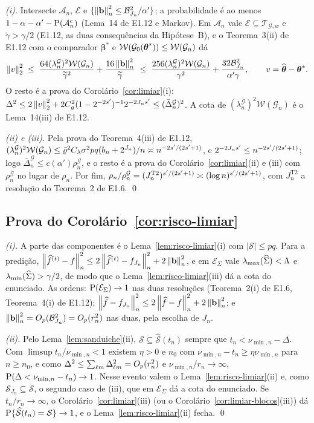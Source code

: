 \documentclass[11pt,a4paper]{article}
\newcommand{\lmin}{\lambda_{\min}}
\newcommand{\bb}{\mathbf{b}}
\newcommand{\gtil}{\widetilde{\gamma}}
\newcommand{\bbeta}{\boldsymbol{\beta}}
\newcommand{\Shat}{\widehat{\mathcal{S}}}
\newcommand{\sepminn}{\nu_{\min,n}}
\newcommand{\rn}{\rho}
\newcommand{\lmaxx}{\lambda_{\max}}
\newcommand{\Gcal}{\mathcal{G}}
\newcommand{\lamG}{\lambda^{\mathcal{G}}_{n}}
\newcommand{\rhoG}{\rho^{\mathcal{G}}_{n}}
\newcommand{\ESig}{\mathcal{E}_{\Sigma}}
\newcommand{\Acal}{\mathcal{A}_{n}}
\newcommand{\Ecal}{\mathcal{E}}
\newcommand{\Dbl}{\Delta_{\cv\md}}
\newcommand{\betastar}{\bbeta^{*}}
\newcommand{\bn}{b_{n}}
\begin{document}
\emph{(i).} Intersecte $\Acal$, $\Ecal$ e $\{\normn{\bb}^{2} \le
\mathcal{B}_{J_{n}}^{2}/\alpha'\}$; a probabilidade é ao menos $1 - \alpha -
\alpha' - \Prob(\Acal^{c})$ (Lema~14 de E1.12 e Markov). Em $\Acal$ vale
$\Ecal \subseteq \mathcal{T}_{\Gcal,w}$ e $\gtil > \gamma/2$ (E1.12, as duas
consequências da Hipótese~B), e o Teorema~3(ii) de E1.12 com o comparador
$\betastar$ e $\mathcal{W}(\mathcal{G}_{0}(\thetastar)) \le \mathcal{W}(\Gcal_{n})$ dá
\[
  \norm{v}_{2}^{2}
  \;\le\; \frac{64(\lamG)^{2}\mathcal{W}(\Gcal_{n})}{\gtil^{2}} + \frac{16\normn{\bb}^{2}}{\gtil}
  \;\le\; \frac{256(\lamG)^{2}\mathcal{W}(\Gcal_{n})}{\gamma^{2}}
  + \frac{32\mathcal{B}_{J_{n}}^{2}}{\alpha'\gamma},
  \qquad v = \thetahat - \thetastar .
\]
O resto é a prova do Corolário~\ref{cor:limiar}(i): $\Delta^{2} \le
2\norm{v}_{2}^{2} + 2C_{g}^{2}(1-2^{-2\seff})^{-1}2^{-2J_{n}\seff} \le
(\bar\Delta_{n}^{\Gcal})^{2}$. A cota de $(\lamG)^{2}\mathcal{W}(\Gcal_{n})$ é o
Lema~14(iii) de E1.12.

\emph{(ii) e (iii).} Pela prova do Teorema~4(iii) de E1.12,
$(\lamG)^{2}\mathcal{W}(\Gcal_{n}) \le \bar\varrho^{2}C_{\pen}\sigma^{2}pq(\bn +
2^{J_{n}})/n \asymp n^{-2\seff/(2\seff+1)}$, e $2^{-2J_{n}s'} \le
n^{-2s'/(2s'+1)}$; logo $\bar\Delta_{n}^{\Gcal} \le c(\alpha')\rhoG$, e o
resto é a prova do Corolário~\ref{cor:limiar}(ii) e (iii) com $\rhoG$ no lugar
de $\rn_{n}$. Por fim, $\rn_{n}/\rhoG = (J_{n}^{\mathrm{T2}})^{\seff/(2\seff+1)}
\asymp (\log n)^{\seff/(2\seff+1)}$, com $J_{n}^{\mathrm{T2}}$ a resolução do
Teorema~2 de E1.6. \qed

\subsection*{Prova do Corolário~\ref{cor:risco-limiar}}

\emph{(i).} A parte das componentes é o Lema~\ref{lem:risco-limiar}(i) com
$|\mathcal{S}| \le pq$. Para a predição, $\normn{\widehat f^{(t)} - f}^{2} \le
2\normn{\widehat f^{(t)} - f_{J_{n}}}^{2} + 2\normn{\bb}^{2}$, e em $\ESig$
vale $\lmaxx(\Gramhat) < \Lambda$ e $\lmin(\Gramhat) > \gamma/2$, de modo que o
Lema~\ref{lem:risco-limiar}(iii) dá a cota do enunciado. As ordens: $\Prob(\ESig)
\to 1$ nas duas resoluções (Teorema~2(i) de E1.6, Teorema~4(i) de E1.12);
$\normn{\widehat f - f_{J_{n}}}^{2} \le 2\normn{\widehat f - f}^{2} +
2\normn{\bb}^{2}$; e $\normn{\bb}^{2} = O_{p}(\mathcal{B}_{J_{n}}^{2}) =
O_{p}(r_{n}^{2})$ nas duas, pela escolha de $J_{n}$.

\emph{(ii).} Pelo Lema~\ref{lem:sanduiche}(ii), $\mathcal{S} \subseteq
\Shat(t_{n})$ sempre que $t_{n} < \sepminn - \Delta$. Com
$\limsup t_{n}/\sepminn < 1$ existem $\eta > 0$ e $n_{0}$ com $\sepminn - t_{n}
\ge \eta\sepminn$ para $n \ge n_{0}$, e como $\Delta^{2} \le
\sum_{\cv\md}\Dbl^{2} = O_{p}(r_{n}^{2})$ e $\sepminn/r_{n} \to \infty$,
$\Prob(\Delta < \sepminn - t_{n}) \to 1$. Nesse evento valem o
Lema~\ref{lem:risco-limiar}(ii) e, como $\mathcal{S}_{J_{n}} \subseteq
\mathcal{S}$, o segundo caso de (iii), que em $\ESig$ dá a cota do enunciado.
Se $t_{n}/r_{n} \to \infty$, o Corolário~\ref{cor:limiar}(iii) (ou o
Corolário~\ref{cor:limiar-blocos}(iii)) dá $\Prob\{\Shat(t_{n}) = \mathcal{S}\}
\to 1$, e o Lema~\ref{lem:risco-limiar}(ii) fecha. \qed
\end{document}
